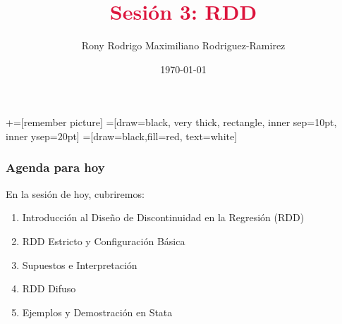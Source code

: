\documentclass[notes,10pt,aspectratio=169]{beamer}
\title[]{\textcolor{crimson}{Sesión 3: RDD}}
\author[RRMRR]{Rony Rodrigo Maximiliano Rodriguez-Ramirez}
\institute[Harvard]{\small{Econ Thaki \\ Harvard University}}
\date{\today}
\begin{document}
\newcommand\marktopleft[1]{%
    \tikz[overlay,remember picture] 
        \node (marker-#1-a) at (-.3em,.3em) {};%
}
\newcommand\markbottomright[2]{%
    \tikz[overlay,remember picture] 
        \node (marker-#1-b) at (0em,0em) {};%
}
+=[remember picture] 
 =[draw=black, very thick, rectangle, inner sep=10pt, inner ysep=20pt]
 =[draw=black,fill=red, text=white]



\begin{frame}
  \maketitle
\end{frame}

\begin{frame}
  \frametitle{Agenda para hoy}

  En la sesión de hoy, cubriremos:
  \begin{enumerate}
    \item Introducción al Diseño de Discontinuidad en la Regresión (RDD)
    \item RDD Estricto y Configuración Básica
    \item Supuestos e Interpretación
    \item RDD Difuso
    \item Ejemplos y Demostración en Stata
  \end{enumerate}
\end{frame}
\end{document}
